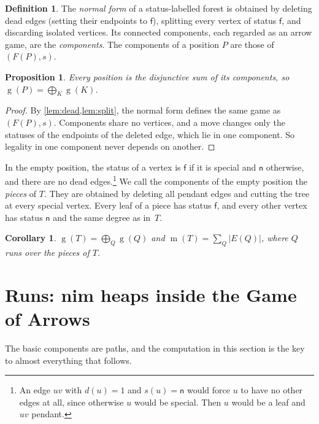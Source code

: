\documentclass[11pt]{amsart}
\newtheorem{proposition}[theorem]{Proposition}
\newtheorem{corollary}[theorem]{Corollary}
\theoremstyle{definition}
\newtheorem{definition}[theorem]{Definition}
\theoremstyle{remark}
\newcommand{\gv}{\operatorname{g}}           %
\newcommand{\m}{\operatorname{m}}
\newcommand{\sn}{\mathsf{n}}
\newcommand{\sff}{\mathsf{f}}
\begin{document}
\begin{definition}\label{def:normalform}
The \emph{normal form} of a status-labelled forest is obtained by deleting dead edges (setting their endpoints to $\sff$), splitting every vertex of status $\sff$, and discarding isolated vertices. Its connected components, each regarded as an arrow game, are the \emph{components}. The components of a position $P$ are those of $(F(P),s)$.
\end{definition}

\begin{proposition}\label{prop:sum}
Every position is the disjunctive sum of its components, so $\gv(P)=\bigoplus_K \gv(K)$.
\end{proposition}

\begin{proof}
By \cref{lem:dead,lem:split}, the normal form defines the same game as $(F(P),s)$. Components share no vertices, and a move changes only the statuses of the endpoints of the deleted edge, which lie in one component. So legality in one component never depends on another.
\end{proof}

In the empty position, the status of a vertex is $\sff$ if it is special and $\sn$ otherwise, and there are no dead edges.\footnote{An edge $uv$ with $d(u)=1$ and $s(u)=\sn$ would force $u$ to have no other edges at all, since otherwise $u$ would be special. Then $u$ would be a leaf and $uv$ pendant.} We call the components of the empty position the \emph{pieces} of $T$. They are obtained by deleting all pendant edges and cutting the tree at every special vertex. Every leaf of a piece has status $\sff$, and every other vertex has status $\sn$ and the same degree as in~$T$.

\begin{corollary}\label{cor:pieces}
$\gv(T)=\bigoplus_{Q}\gv(Q)$ and $\m(T)=\sum_Q |E(Q)|$, where $Q$ runs over the pieces of $T$.
\end{corollary}

\section{Runs: nim heaps inside the Game of Arrows}\label{sec:runs}

The basic components are paths, and the computation in this section is the key to almost everything that follows.
\end{document}
